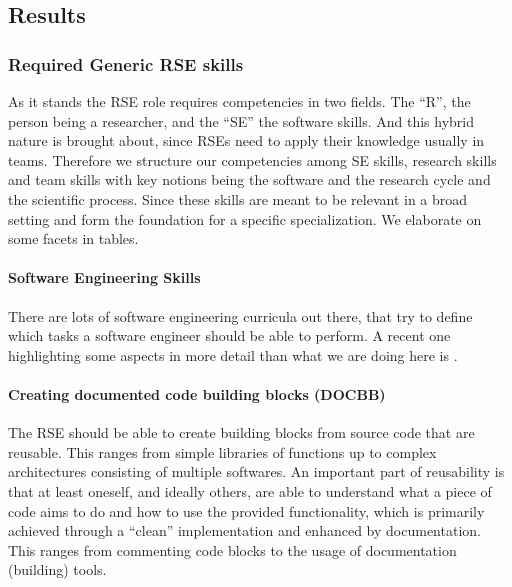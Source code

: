 \documentclass[a4paper
]{article}
\begin{document}
\hypertarget{results}{%
\subsection{Results}\label{results}}

\hypertarget{required-generic-rse-skills}{%
\subsubsection{Required Generic RSE
skills}\label{required-generic-rse-skills}}

As it stands the RSE role requires competencies in two fields. The
``R'', the person being a researcher, and the ``SE'' the software
skills. And this hybrid nature is brought about, since RSEs need to
apply their knowledge usually in teams. Therefore we structure our
competencies among SE skills, research skills and team skills with key
notions being the software and the research cycle and the scientific
process. Since these skills are meant to be relevant in a broad setting
and form the foundation for a specific specialization. We elaborate on
some facets in tables.

\hypertarget{software-engineering-skills}{%
\paragraph{Software Engineering
Skills}\label{software-engineering-skills}}

There are lots of software engineering curricula out there, that try to
define which tasks a software engineer should be able to perform. A
recent one highlighting some aspects in more detail than what we are
doing here is \autocite{Landwehr2017}.

\hypertarget{creating-documented-code-building-blocks-docbb}{%
\paragraph{Creating documented code building blocks
(DOCBB)}\label{creating-documented-code-building-blocks-docbb}}

The RSE should be able to create building blocks from source code that
are reusable. This ranges from simple libraries of functions up to
complex architectures consisting of multiple softwares. An important
part of reusability is that at least oneself, and ideally others, are
able to understand what a piece of code aims to do and how to use the
provided functionality, which is primarily achieved through a ``clean''
implementation and enhanced by documentation. This ranges from
commenting code blocks to the usage of documentation (building) tools.
\end{document}
